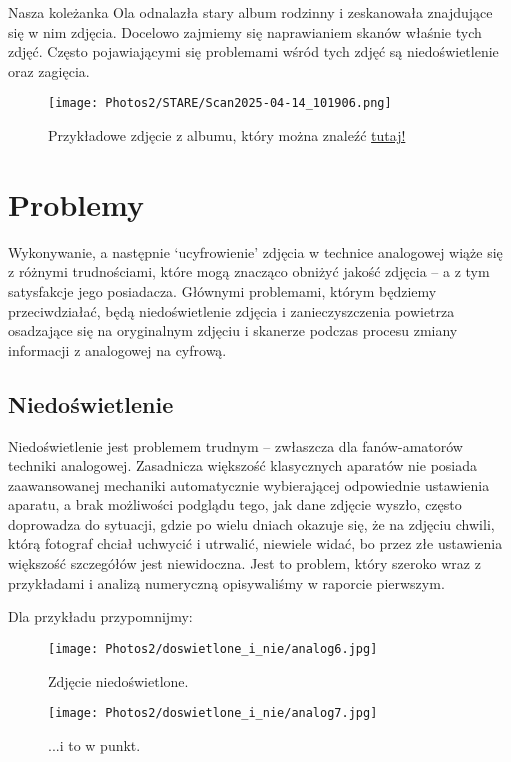 \documentclass[]{mwart}
\begin{document}
Nasza koleżanka Ola odnalazła stary album rodzinny i zeskanowała znajdujące się w nim zdjęcia.
Docelowo zajmiemy się naprawianiem skanów właśnie tych zdjęć.
Często pojawiającymi się problemami wśród tych zdjęć są niedoświetlenie oraz zagięcia.

\begin{figure}[H]
    \centering
    \texttt{[image: Photos2/STARE/Scan2025-04-14\_101906.png]}
    \caption{Przykładowe zdjęcie z albumu, który można znaleźć \href{https://drive.google.com/drive/folders/1FME2DGxQ3jP6B-MKmGzHXzVHgdVP4-Fq}{tutaj!} }
\end{figure}

\newpage
\section{Problemy}
Wykonywanie, a następnie `ucyfrowienie' zdjęcia w technice analogowej wiąże się z różnymi trudnościami,
które mogą znacząco obniżyć jakość zdjęcia -- a z tym satysfakcje jego posiadacza. Głównymi problemami,
którym będziemy przeciwdziałać, będą niedoświetlenie zdjęcia i zanieczyszczenia powietrza osadzające
się na oryginalnym zdjęciu i skanerze podczas procesu zmiany informacji z analogowej na cyfrową.

\subsection{Niedoświetlenie} %
Niedoświetlenie jest problemem trudnym -- zwłaszcza dla fanów-amatorów techniki analogowej.
Zasadnicza większość klasycznych aparatów nie posiada zaawansowanej mechaniki automatycznie wybierającej
odpowiednie ustawienia aparatu, a brak możliwości podglądu tego, jak dane zdjęcie wyszło, często doprowadza
do sytuacji, gdzie po wielu dniach okazuje się, że na zdjęciu chwili, którą fotograf chciał uchwycić i utrwalić,
niewiele widać, bo przez złe ustawienia większość szczegółów jest niewidoczna. Jest to problem, który szeroko
wraz z przykładami i analizą numeryczną opisywaliśmy w raporcie pierwszym.

Dla przykładu przypomnijmy:
\newpage
\begin{figure}[H]
    \centering
    \texttt{[image: Photos2/doswietlone\_i\_nie/analog6.jpg]}
    \caption{Zdjęcie niedoświetlone.}
\end{figure}
\begin{figure}[H]
    \centering
    \texttt{[image: Photos2/doswietlone\_i\_nie/analog7.jpg]}
    \caption{...i to w punkt.}
\end{figure}
\end{document}
